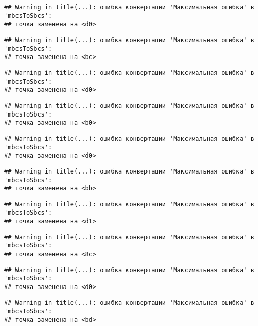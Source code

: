 \documentclass[
]{article}
\begin{document}
\begin{verbatim}
## Warning in title(...): ошибка конвертации 'Максимальная ошибка' в 'mbcsToSbcs':
## точка заменена на <d0>
\end{verbatim}

\begin{verbatim}
## Warning in title(...): ошибка конвертации 'Максимальная ошибка' в 'mbcsToSbcs':
## точка заменена на <bc>
\end{verbatim}

\begin{verbatim}
## Warning in title(...): ошибка конвертации 'Максимальная ошибка' в 'mbcsToSbcs':
## точка заменена на <d0>
\end{verbatim}

\begin{verbatim}
## Warning in title(...): ошибка конвертации 'Максимальная ошибка' в 'mbcsToSbcs':
## точка заменена на <b0>
\end{verbatim}

\begin{verbatim}
## Warning in title(...): ошибка конвертации 'Максимальная ошибка' в 'mbcsToSbcs':
## точка заменена на <d0>
\end{verbatim}

\begin{verbatim}
## Warning in title(...): ошибка конвертации 'Максимальная ошибка' в 'mbcsToSbcs':
## точка заменена на <bb>
\end{verbatim}

\begin{verbatim}
## Warning in title(...): ошибка конвертации 'Максимальная ошибка' в 'mbcsToSbcs':
## точка заменена на <d1>
\end{verbatim}

\begin{verbatim}
## Warning in title(...): ошибка конвертации 'Максимальная ошибка' в 'mbcsToSbcs':
## точка заменена на <8c>
\end{verbatim}

\begin{verbatim}
## Warning in title(...): ошибка конвертации 'Максимальная ошибка' в 'mbcsToSbcs':
## точка заменена на <d0>
\end{verbatim}

\begin{verbatim}
## Warning in title(...): ошибка конвертации 'Максимальная ошибка' в 'mbcsToSbcs':
## точка заменена на <bd>
\end{verbatim}
\end{document}
